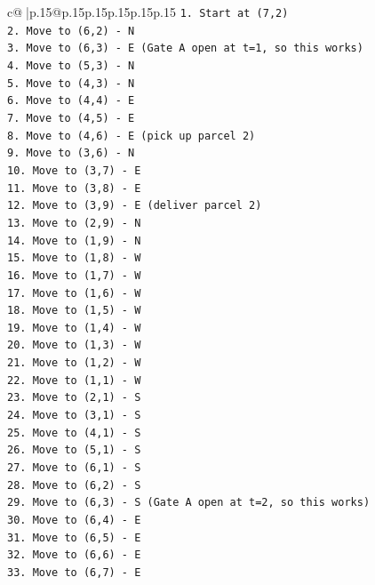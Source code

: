 \documentclass{article}
\begin{document}
{\begin{supertabular}{c@{$\;$}|p{.15\linewidth}@{}p{.15\linewidth}p{.15\linewidth}p{.15\linewidth}p{.15\linewidth}p{.15\linewidth}}
{{{\texttt{1. Start at (7,2)} \\
\texttt{2. Move to (6,2) {-} N} \\
\texttt{3. Move to (6,3) {-} E (Gate A open at t=1, so this works)} \\
\texttt{4. Move to (5,3) {-} N} \\
\texttt{5. Move to (4,3) {-} N} \\
\texttt{6. Move to (4,4) {-} E} \\
\texttt{7. Move to (4,5) {-} E} \\
\texttt{8. Move to (4,6) {-} E (pick up parcel 2)} \\
\texttt{9. Move to (3,6) {-} N} \\
\texttt{10. Move to (3,7) {-} E} \\
\texttt{11. Move to (3,8) {-} E} \\
\texttt{12. Move to (3,9) {-} E (deliver parcel 2)} \\
\texttt{13. Move to (2,9) {-} N} \\
\texttt{14. Move to (1,9) {-} N} \\
\texttt{15. Move to (1,8) {-} W} \\
\texttt{16. Move to (1,7) {-} W} \\
\texttt{17. Move to (1,6) {-} W} \\
\texttt{18. Move to (1,5) {-} W} \\
\texttt{19. Move to (1,4) {-} W} \\
\texttt{20. Move to (1,3) {-} W} \\
\texttt{21. Move to (1,2) {-} W} \\
\texttt{22. Move to (1,1) {-} W} \\
\texttt{23. Move to (2,1) {-} S} \\
\texttt{24. Move to (3,1) {-} S} \\
\texttt{25. Move to (4,1) {-} S} \\
\texttt{26. Move to (5,1) {-} S} \\
\texttt{27. Move to (6,1) {-} S} \\
\texttt{28. Move to (6,2) {-} S} \\
\texttt{29. Move to (6,3) {-} S (Gate A open at t=2, so this works)} \\
\texttt{30. Move to (6,4) {-} E} \\
\texttt{31. Move to (6,5) {-} E} \\
\texttt{32. Move to (6,6) {-} E} \\
\texttt{33. Move to (6,7) {-} E} \\
}}}
\end{supertabular}}
\end{document}
